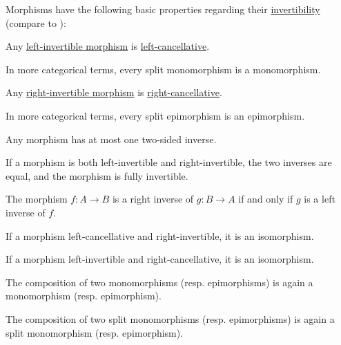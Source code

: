 \begin{proposition}\label{thm:def:morphism_invertibility/properties}
  Morphisms have the following basic properties regarding their \hyperref[def:morphism_invertibility]{invertibility} (compare to ):

  \begin{thmenum}
     Any \hyperref[def:morphism_invertibility/left_invertible]{left-invertible morphism} is \hyperref[def:morphism_invertibility/left_cancellative]{left-cancellative}.

    In more categorical terms, every split monomorphism is a monomorphism.

     Any \hyperref[def:morphism_invertibility/right_invertible]{right-invertible morphism} is \hyperref[def:morphism_invertibility/right_cancellative]{right-cancellative}.

    In more categorical terms, every split epimorphism is an epimorphism.

     Any morphism has at most one two-sided inverse.

     If a morphism is both left-invertible and right-invertible, the two inverses are equal, and the morphism is fully invertible.

     The morphism \( f: A \to B \) is a right inverse of \( g: B \to A \) if and only if \( g \) is a left inverse of \( f \).

     If a morphism left-cancellative and right-invertible, it is an isomorphism.

     If a morphism left-invertible and right-cancellative, it is an isomorphism.

     The composition of two monomorphisms (resp. epimorphisms) is again a monomorphism (resp. epimorphism).

     The composition of two split monomorphisms (resp. epimorphisms) is again a split monomorphism (resp. epimorphism).
  \end{thmenum}
\end{proposition}
